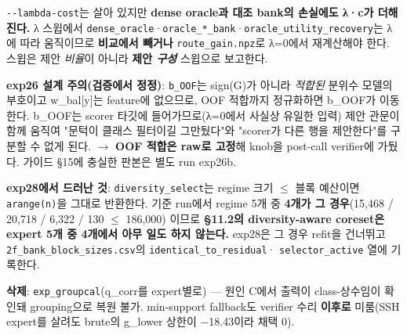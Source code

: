 \par\noindent \textbullet\enspace \texttt{-\allowbreak{}-\allowbreak{}lambda\allowbreak{}-\allowbreak{}cost}는 살아 있지만 \textbf{dense oracle과 대조 bank의 손실에도 λ·c가 더해진다.} λ 스윕에서 \texttt{dense\_\allowbreak{}\allowbreak{}or\allowbreak{}acle}·\texttt{oracle\_\allowbreak{}\allowbreak{}*\allowbreak{}\_\allowbreak{}\allowbreak{}bank}·\texttt{oracle\_\allowbreak{}\allowbreak{}u\allowbreak{}tility\_\allowbreak{}\allowbreak{}r\allowbreak{}ecovery}는 λ에 따라 움직이므로 \textbf{비교에서 빼거나} \texttt{route\_\allowbreak{}\allowbreak{}ga\allowbreak{}in.\allowbreak{}npz}로 λ=\allowbreak{}0에서 재계산해야 한다. 스윕은 제안 \emph{비율}이 아니라 \textbf{제안 \emph{구성}} 스윕으로 보고한다.


\textbf{exp26 설계 주의(검증에서 정정)}: \texttt{b\_\allowbreak{}\allowbreak{}OOF}는 sign(G)가 아니라 \emph{적합된} 분위수 모델의 부호이고 w\_\allowbreak{}bal[y]는 feature에 없으므로, OOF 적합까지 정규화하면 b\_\allowbreak{}OOF가 이동한다. b\_\allowbreak{}OOF는 scorer 타깃에 들어가므로(λ=\allowbreak{}0에서 사실상 유일한 입력) 제안 관문이 함께 움직여 "문턱이 클래스 필터이길 그만뒀다"와 "scorer가 다른 행을 제안한다"를 구분할 수 없게 된다.  \ensuremath{\rightarrow}  \textbf{OOF 적합은 raw로 고정}해 knob을 post-call verifier에 가뒀다. 가이드 §15에 충실한 판본은 별도 run exp26b.

\textbf{exp28에서 드러난 것}: \texttt{diversit\allowbreak{}y\_\allowbreak{}\allowbreak{}select\allowbreak{}}는 regime 크기 \ensuremath{\leq} 블록 예산이면 \texttt{arange(n\allowbreak{})}을 그대로 반환한다. 기준 run에서 regime 5개 중 \textbf{4개가 그 경우}(15,468 /\allowbreak{} 20,718 /\allowbreak{} 6,322 /\allowbreak{} 130 \ensuremath{\leq} 186,000) 이므로 \textbf{§11.2의 diversity-aware coreset은 expert 5개 중 4개에서 아무 일도 하지 않는다.} exp28은 그 경우 refit을 건너뛰고 \texttt{2f\_\allowbreak{}\allowbreak{}bank\_\allowbreak{}\allowbreak{}block\_\allowbreak{}\allowbreak{}si\allowbreak{}zes.\allowbreak{}csv}의 \texttt{identica\allowbreak{}l\_\allowbreak{}\allowbreak{}to\_\allowbreak{}\allowbreak{}res\allowbreak{}idual}· \texttt{selector\allowbreak{}\_\allowbreak{}\allowbreak{}active} 열에 기록한다.

\textbf{삭제}: \texttt{exp\_\allowbreak{}\allowbreak{}grou\allowbreak{}pcal}(q\_\allowbreak{}corr를 expert별로) — 원인 C에서 출력이 class-상수임이 확인돼 grouping으로 복원 불가. min-support fallback도 verifier 수리 \textbf{이후로} 미룸(SSH expert를 살려도 brute의 g\_\allowbreak{}lower 상한이 −18.43이라 채택 0).

